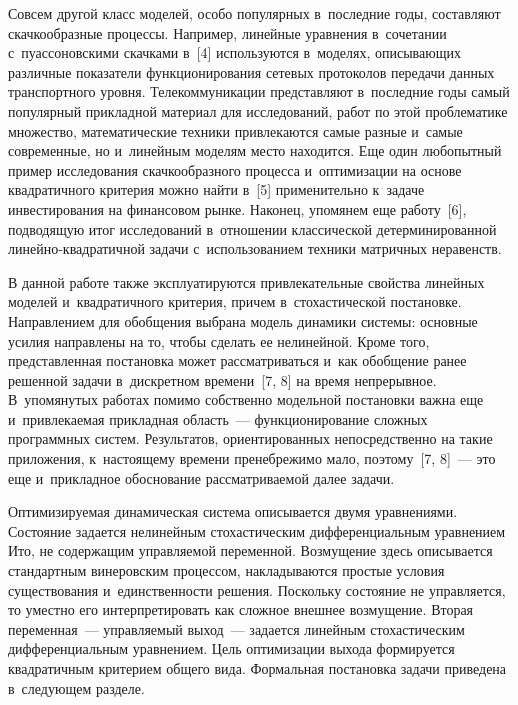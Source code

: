 \begin{multicols}{2}
Совсем другой класс моделей, особо популярных в~по\-след\-ние годы, 
составляют скачкообразные процессы. Например, линейные уравнения 
в~сочетании с~пуассоновскими скачками в~[4] используются в~моделях, 
описывающих различные показатели функционирования сетевых протоколов 
передачи данных транспортного уровня. Телекоммуникации представляют 
в~последние годы самый популярный прикладной материал для 
исследований, работ по этой проб\-ле\-ма\-ти\-ке множество, математические 
техники привлекаются самые разные и~самые современные, но и~линейным 
моделям место находится. Еще один любопытный пример исследования 
скачкообразного процесса и~оптимизации на основе квад\-ра\-тич\-но\-го критерия 
можно найти в~[5] применительно к~задаче инвестирования на финансовом 
рынке. Наконец, упомянем еще работу~[6], подводящую итог исследований 
в~отношении классической детерминированной  
ли\-ней\-но-квад\-ра\-тич\-ной задачи с~использованием техники матричных 
неравенств.
     
     В данной работе также эксплуатируются привлекательные свойства 
линейных моделей и~квад\-ра\-тич\-но\-го критерия, причем в~стохастической 
постановке. На\-прав\-ле\-ни\-ем для обобщения \mbox{выбрана} модель динамики 
сис\-те\-мы: основные усилия на\-прав\-ле\-ны на то, чтобы сделать ее нелинейной. 
Кроме того, пред\-став\-лен\-ная постановка может рас\-смат\-ри\-вать\-ся и~как 
обобщение ранее решенной задачи в~дискретном времени~[7, 8] на время 
непрерывное. В~упомянутых работах помимо собственно модельной 
постановки важна еще и~привлекаемая прикладная об\-ласть~--- 
функционирование сложных программных сис\-тем. Результатов, 
ориентированных непосредственно на такие приложения, к~настоящему 
времени пренебрежимо мало, поэтому~[7, 8]~--- это еще и~прикладное 
обоснование рас\-смат\-ри\-ва\-емой далее задачи.
     
     Оптимизируемая динамическая сис\-те\-ма описывается двумя 
уравнениями. Состояние задается нелинейным стохастическим 
дифференциальным уравнением Ито, не содержащим управ\-ля\-емой 
переменной. Возмущение здесь описывается стандартным винеровским 
процессом, накладываются простые условия существования 
и~един\-ст\-вен\-ности решения. Поскольку состояние не управ\-ля\-ет\-ся, то уместно 
его интерпретировать как слож\-ное внешнее возмущение. Вторая 
переменная~--- управ\-ля\-емый выход~--- задается линейным стохастическим 
дифференциальным уравнением. Цель оптимизации выхода формируется 
квадратичным критерием общего вида. Формальная постановка задачи 
приведена в~сле\-ду\-ющем разделе.
     

\end{multicols}
